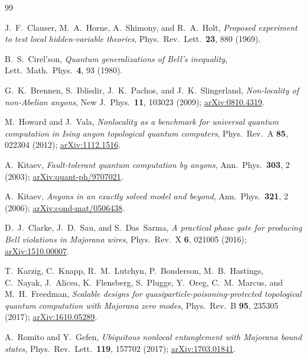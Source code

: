 \documentclass[aps,pra,twocolumn,superscriptaddress,floatfix,nofootinbib]{revtex4-2}
\begin{document}
\begin{thebibliography}{99}

J.~F.~Clauser, M.~A.~Horne, A.~Shimony, and R.~A.~Holt,
\emph{Proposed experiment to test local hidden-variable theories},
Phys.\ Rev.\ Lett.\ \textbf{23}, 880 (1969).

B.~S.~Cirel'son,
\emph{Quantum generalizations of Bell's inequality},
Lett.\ Math.\ Phys.\ \textbf{4}, 93 (1980).

G.~K.~Brennen, S.~Iblisdir, J.~K.~Pachos, and J.~K.~Slingerland,
\emph{Non-locality of non-Abelian anyons},
New J.\ Phys.\ \textbf{11}, 103023 (2009);
\href{https://arxiv.org/abs/0810.4319}{arXiv:0810.4319}.

M.~Howard and J.~Vala,
\emph{Nonlocality as a benchmark for universal quantum computation in
Ising anyon topological quantum computers},
Phys.\ Rev.\ A \textbf{85}, 022304 (2012);
\href{https://arxiv.org/abs/1112.1516}{arXiv:1112.1516}.

A.~Kitaev,
\emph{Fault-tolerant quantum computation by anyons},
Ann.\ Phys.\ \textbf{303}, 2 (2003);
\href{https://arxiv.org/abs/quant-ph/9707021}{arXiv:quant-ph/9707021}.

A.~Kitaev,
\emph{Anyons in an exactly solved model and beyond},
Ann.\ Phys.\ \textbf{321}, 2 (2006);
\href{https://arxiv.org/abs/cond-mat/0506438}{arXiv:cond-mat/0506438}.

D.~J.~Clarke, J.~D.~Sau, and S.~Das~Sarma,
\emph{A practical phase gate for producing Bell violations in Majorana wires},
Phys.\ Rev.\ X \textbf{6}, 021005 (2016);
\href{https://arxiv.org/abs/1510.00007}{arXiv:1510.00007}.

T.~Karzig, C.~Knapp, R.~M.~Lutchyn, P.~Bonderson, M.~B.~Hastings,
C.~Nayak, J.~Alicea, K.~Flensberg, S.~Plugge, Y.~Oreg, C.~M.~Marcus,
and M.~H.~Freedman,
\emph{Scalable designs for quasiparticle-poisoning-protected
topological quantum computation with Majorana zero modes},
Phys.\ Rev.\ B \textbf{95}, 235305 (2017);
\href{https://arxiv.org/abs/1610.05289}{arXiv:1610.05289}.

A.~Romito and Y.~Gefen,
\emph{Ubiquitous nonlocal entanglement with Majorana bound states},
Phys.\ Rev.\ Lett.\ \textbf{119}, 157702 (2017);
\href{https://arxiv.org/abs/1703.01841}{arXiv:1703.01841}.


\end{thebibliography}
\end{document}
